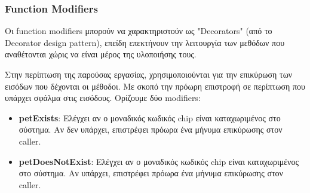 \documentclass[12pt,a4paper]{article}
\begin{document}
\subsubsection{Function Modifiers}
Οι function modifiers μπορούν να χαρακτηριστούν ως "Decorators" (από το Decorator design pattern), επείδη επεκτήνουν την λειτουργία των μεθόδων που αναθέτονται χώρις να είναι μέρος της υλοποιήσης τους.

Στην περίπτωση της παρούσας εργασίας, χρησιμοποιούνται για την επικύρωση των εισόδων που δέχονται οι μέθοδοι. Με σκοπό την πρόωρη επιστροφή σε περίπτωση που υπάρχει σφάλμα στις εισόδους. Ορίζουμε δύο modifiers:
\begin{itemize}
    \item \textbf{petExists}: Ελέγχει αν ο μοναδικός κωδικός chip είναι καταχωριμένος στο σύστημα. Αν δεν υπάρχει, επιστρέφει πρόωρα ένα μήνυμα επικύρωσης στον caller.
    \item \textbf{petDoesNotExist}: Ελέγχει αν ο μοναδικός κωδικός chip είναι καταχωριμένος στο σύστημα. Αν υπάρχει, επιστρέφει πρόωρα ένα μήνυμα επικύρωσης στον caller.
\end{itemize}
\end{document}
